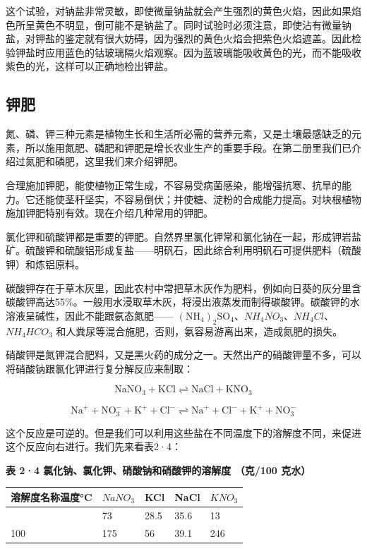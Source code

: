 这个试验，对钠盐非常灵敏，即使微量钠盐就会产生强烈的黄色火焰，因此如果焰色所呈黄色不明显，倒可能不是钠盐了。同时试验时必须注意，即使沾有微量钠盐，对钾盐的鉴定就有很大妨碍，因为强烈的黄色火焰会把紫色火焰遮盖。因此检验钾盐时应用蓝色的钴玻璃隔火焰观察。因为蓝玻璃能吸收黄色的光，而不能吸收紫色的光，这样可以正确地检出钾盐。

\subsection{钾肥}

氮、磷、钾三种元素是植物生长和生活所必需的营养元素，又是土壤最感缺乏的元素，所以施用氮肥、磷肥和钾肥是增长农业生产的重要手段。在第二册里我们已介绍过氮肥和磷肥，这里我们来介绍钾肥。

合理施加钾肥，能使植物正常生成，不容易受病菌感染，能增强抗寒、抗旱的能力。它还能使茎秆坚实，不容易倒伏；并使糖、淀粉的合成能力提高。对块根植物施加钾肥特别有效。现在介绍几种常用的钾肥。

氯化钾和硫酸钾都是重要的钾肥。自然界里氯化钾常和氯化钠在一起，形成钾岩盐矿。硫酸钾和硫酸铝形成复盐------明矾石，因此综合利用明矾石可提供肥料（硫酸钾）和炼铝原料。

碳酸钾存在于草木灰里，因此农村中常把草木灰作为肥料，例如向日葵的灰分里含碳酸钾高达55\%。一般用水浸取草木灰，将浸出液蒸发而制得碳酸钾。碳酸钾的水溶液呈碱性，因此不能跟氨态氮肥------
\(\left(\mathrm{NH}_{4}\right)_{2}\mathrm{SO}_{4}\)、\(NH_{4}NO_{3}\)、\(NH_{4}Cl\)、\(NH_{4}HCO_{3}\)
和人粪尿等混合施肥，否则，氨容易游离出来，造成氮肥的损失。

硝酸钾是氮钾混合肥料，又是黑火药的成分之一。天然出产的硝酸钾量不多，可以将硝酸钠跟氯化钾进行复分解反应来制取：

\[
\mathrm{NaNO} _ {3} + \mathrm{KCl} \rightleftharpoons \mathrm{NaCl} + \mathrm{KNO} _ {3}
\]

\[
\mathrm{Na} ^ {+} + \mathrm{NO} _ {3} ^ {-} + \mathrm{K} ^ {+} + \mathrm{Cl} ^ {-} \rightleftharpoons \mathrm{Na} ^ {+} + \mathrm{Cl} ^ {-} + \mathrm{K} ^ {+} + \mathrm{NO} _ {3} ^ {-}
\]

这个反应是可逆的。但是我们可以利用这些盐在不同温度下的溶解度不同，来促进这个反应向右进行。我们先来看表2·4：

\textbf{表 2·4 氯化钠、氯化钾、硝酸钠和硝酸钾的溶解度 （克/100 克水）}

{\def\LTcaptype{none} %
\begin{longtable}[]{@{}lllll@{}}
\toprule\noalign{}
溶解度名称温度°C & \(NaNO_3\) & KCl & NaCl & \(KNO_3\) \\
\midrule\noalign{}
\endhead
\bottomrule\noalign{}
\endlastfoot
0 & 73 & 28.5 & 35.6 & 13 \\
100 & 175 & 56 & 39.1 & 246 \\
\end{longtable}
}

